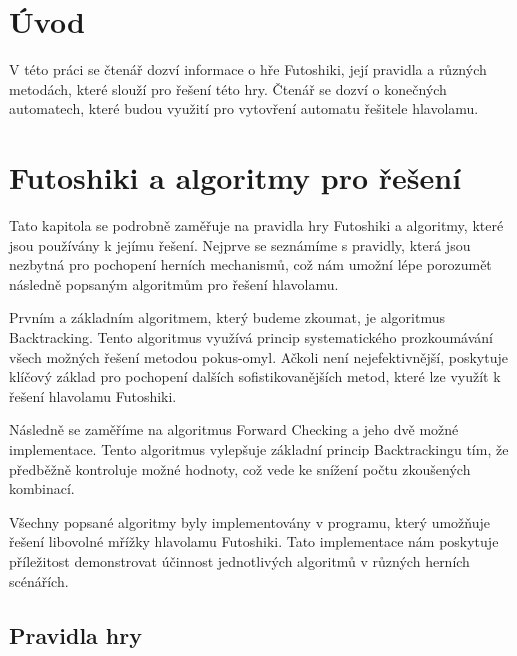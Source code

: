 
%

\chapter{Úvod}

V této práci se čtenář dozví informace o hře Futoshiki, její pravidla a různých
metodách, které slouží pro řešení této hry. Čtenář se dozví o konečných
automatech, které budou využití pro vytovření automatu řešitele hlavolamu.

\chapter{Futoshiki a algoritmy pro řešení}

Tato kapitola se podrobně zaměřuje na pravidla hry Futoshiki a algoritmy, které
jsou používány k jejímu řešení. Nejprve se seznámíme s pravidly, která jsou
nezbytná pro pochopení herních mechanismů, což nám umožní lépe porozumět
následně popsaným algoritmům pro řešení hlavolamu.

Prvním a základním algoritmem, který budeme zkoumat, je algoritmus
Backtracking. Tento algoritmus využívá princip systematického prozkoumávání
všech možných řešení metodou pokus-omyl. Ačkoli není nejefektivnější, poskytuje
klíčový základ pro pochopení dalších sofistikovanějších metod, které lze využít
k řešení hlavolamu Futoshiki.

Následně se zaměříme na algoritmus Forward Checking a jeho dvě možné
implementace. Tento algoritmus vylepšuje základní princip Backtrackingu tím, že
předběžně kontroluje možné hodnoty, což vede ke snížení počtu zkoušených
kombinací.

Všechny popsané algoritmy byly implementovány v programu, který umožňuje řešení
libovolné mřížky hlavolamu Futoshiki. Tato implementace nám poskytuje
příležitost demonstrovat účinnost jednotlivých algoritmů v různých herních
scénářích.

\section{Pravidla hry}

